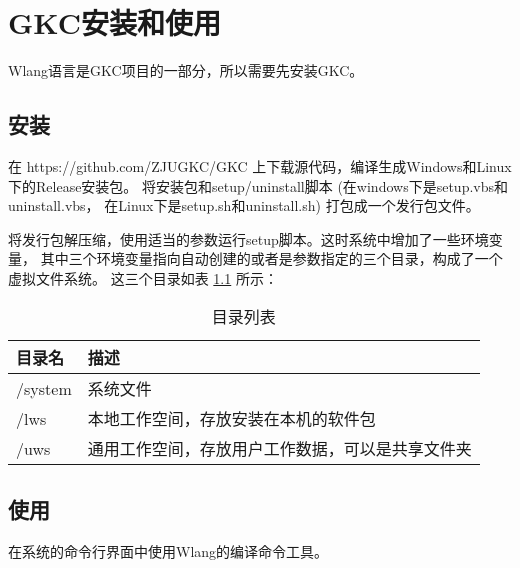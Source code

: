 ﻿%
%

\chapter{GKC安装和使用}

Wlang语言是GKC项目的一部分，所以需要先安装GKC。

\section{安装}

在 https://github.com/ZJUGKC/GKC 上下载源代码，编译生成Windows和Linux下的Release安装包。
将安装包和setup/uninstall脚本 (在windows下是setup.vbs和uninstall.vbs，
在Linux下是setup.sh和uninstall.sh) 打包成一个发行包文件。

将发行包解压缩，使用适当的参数运行setup脚本。这时系统中增加了一些环境变量，
其中三个环境变量指向自动创建的或者是参数指定的三个目录，构成了一个虚拟文件系统。
这三个目录如表 \ref{tab:setup:directories} 所示：

\begin{table}[h]
  \centering
  \caption{目录列表}\label{tab:setup:directories}
\begin{tabular}{|l|l|}
  \hline
  \textbf{目录名} &  \textbf{描述} \\
  \hline\hline
  /system &  系统文件 \\
  \hline
  /lws &  本地工作空间，存放安装在本机的软件包 \\
  \hline
  /uws &  通用工作空间，存放用户工作数据，可以是共享文件夹 \\
  \hline
\end{tabular}

\end{table}

\section{使用}

在系统的命令行界面中使用Wlang的编译命令工具。
